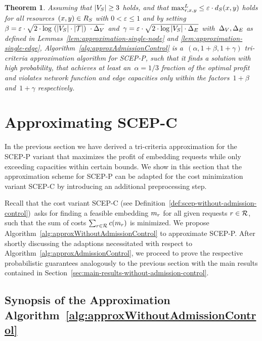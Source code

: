 \documentclass[10pt, conference, letterpaper]{IEEEtran}
\newtheorem{theorem}{Theorem}
\begin{document}
\begin{theorem}
\label{thm:result-for-admission-control}
Assuming that $|V_S| \geq 3$ holds, and that $\maxLoadV[\req][x][y] \leq \varepsilon \cdot \Scap(x,y)$ holds for all resources~$(x,y) \in  R_{S}$ with $0 < \varepsilon \leq 1$ and by setting~$\beta = \varepsilon \cdot \sqrt{2\cdot \log~(|V_S|\cdot|\mathcal{T}|)~\cdot \Delta_V  }$ and~$\gamma = \varepsilon \cdot \sqrt{2\cdot \log |V_S| \cdot \Delta_E  }$ with~$\Delta_V,\Delta_E$ as defined in Lemmas~\ref{lem:approximation-single-node} and \ref{lem:approximation-single-edge}, Algorithm~\ref{alg:approxAdmissionControl} is a~$(\alpha,1+\beta,1+\gamma)$ tri-criteria approximation algorithm for  SCEP-P, such that it finds a solution \emph{with high probability}, that achieves at least an~$\alpha = 1/3$ fraction of the optimal profit and violates network function and edge capacities only within the factors~$1+\beta$ and~$1+\gamma$ respectively.
\end{theorem}

\section{Approximating SCEP-C}

\label{sec:approximation-without-admission-control}
In the previous section we have derived a tri-criteria approximation for the SCEP-P variant that maximizes the profit of embedding requests while only exceeding capacities within certain bounds. We show in this section that the approximation scheme for SCEP-P can be adapted for the cost minimization variant SCEP-C by introducing an additional preprocessing step. 

Recall that the cost variant SCEP-C (see Definition~\ref{def:scep-without-admission-control})~asks for finding a feasible embedding $m_{r}$ for all given requests $r \in \mathcal{R}$, such that the sum of costs $\sum_{r \in \mathcal{R}} c(m_{r})$ is minimized. We propose Algorithm~\ref{alg:approxWithoutAdmissionControl} to approximate SCEP-P. After shortly discussing the adaptions necessitated with respect to Algorithm~\ref{alg:approxAdmissionControl}, we proceed to prove the respective probabilistic guarantees analogously to the previous section with the main results contained in Section~\ref{sec:main-results-without-admission-control}.

\subsection{Synopsis of the Approximation Algorithm~\ref{alg:approxWithoutAdmissionControl}}
\end{document}
